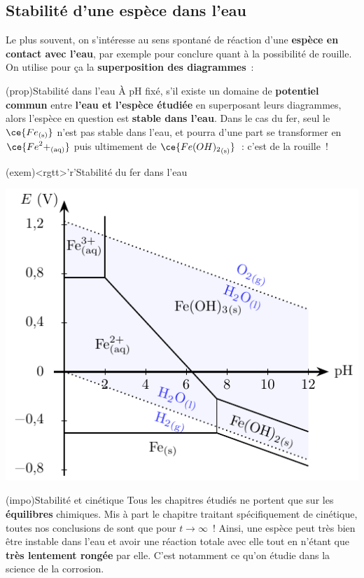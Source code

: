 \documentclass[a4paper, 10pt, landscape, twocolumn]{book}
\begin{document}
\subsection{Stabilité d'une espèce dans l'eau}
Le plus souvent, on s'intéresse au sens spontané de réaction d'une
\textbf{espèce en contact avec l'eau}, par exemple pour conclure quant à la
possibilité de rouille. On utilise pour ça la \textbf{superposition des
	diagrammes}~:
\begin{tcbraster}[raster equal height=rows, raster columns=2]
	\begin{tcb*}(prop){Stabilité dans l'eau}
		À pH fixé, s'il existe un domaine de \textbf{potentiel commun} entre
		\textbf{l'eau et l'espèce étudiée} en superposant leurs diagrammes, alors
		l'espèce en question est \textbf{stable dans l'eau}.
		\bigbreak
		Dans le cas du fer, seul le $\ce{Fe_{\rm(s)}}$ n'est pas stable dans l'eau,
		et pourra d'une part se transformer en $\ce{{Fe}^2+_{\rm(aq)}}$ puis
		ultimement de $\ce{{Fe(OH)_2}_{\rm(s)}}$~: c'est de la rouille~!
	\end{tcb*}
	\begin{tcb*}(exem)<rgtt>'r'{Stabilité du fer dans l'eau}
		\begin{center}
			\includegraphics[width=\linewidth]{eph_fer-eau}
		\end{center}
	\end{tcb*}
\end{tcbraster}

\begin{tcb*}(impo){Stabilité et cinétique}
	Tous les chapitres étudiés ne portent que sur les \textbf{équilibres}
	chimiques. Mis à part le chapitre traitant spécifiquement de cinétique, toutes
	nos conclusions de sont que pour $t \to \infty$~!
	\smallbreak
	Ainsi, une espèce peut très bien être instable dans l'eau et avoir une
	réaction totale avec elle tout en n'étant que \textbf{très lentement rongée}
	par elle. C'est notamment ce qu'on étudie dans la science de la corrosion.
\end{tcb*}
\end{document}
